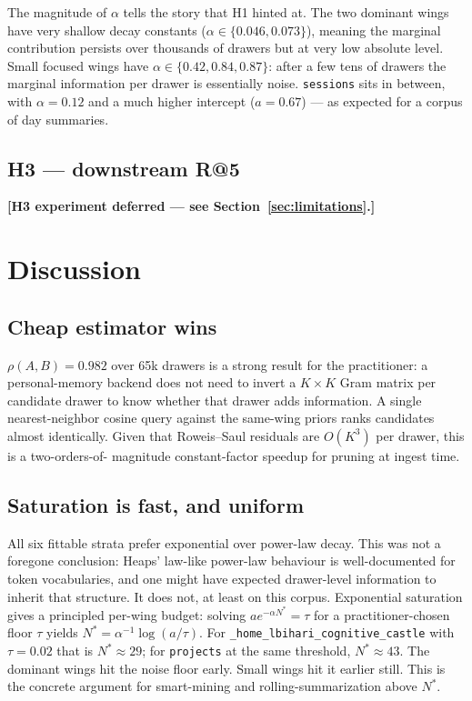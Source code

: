 \documentclass[11pt]{article}
\begin{document}
The magnitude of $\alpha$ tells the story that H1 hinted at.
The two dominant wings have very shallow decay constants
($\alpha \in \{0.046, 0.073\}$), meaning the marginal contribution
persists over thousands of drawers but at very low absolute level.
Small focused wings have $\alpha \in \{0.42, 0.84, 0.87\}$: after a
few tens of drawers the marginal information per drawer is
essentially noise. \texttt{sessions} sits in between, with
$\alpha = 0.12$ and a much higher intercept ($a = 0.67$) --- as
expected for a corpus of day summaries.

\subsection{H3 --- downstream R@5}
\textbf{[H3 experiment deferred --- see
Section~\ref{sec:limitations}.]}

\section{Discussion}
\label{sec:discussion}

\subsection{Cheap estimator wins}
$\rho(A, B) = 0.982$ over 65k drawers is a strong result for the
practitioner: a personal-memory backend does not need to invert a
$K \times K$ Gram matrix per candidate drawer to know whether that
drawer adds information. A single nearest-neighbor cosine query against
the same-wing priors ranks candidates almost identically. Given that
Roweis--Saul residuals are $O(K^3)$ per drawer, this is a two-orders-of-
magnitude constant-factor speedup for pruning at ingest time.

\subsection{Saturation is fast, and uniform}
All six fittable strata prefer exponential over power-law decay. This
was not a foregone conclusion: Heaps' law-like power-law behaviour
\citep{heaps1978} is well-documented for token vocabularies, and one
might have expected drawer-level information to inherit that structure.
It does not, at least on this corpus. Exponential saturation gives a
principled per-wing budget: solving $a e^{-\alpha N^*} = \tau$ for a
practitioner-chosen floor $\tau$ yields
$N^* = \alpha^{-1} \log(a / \tau)$. For
\texttt{\_home\_lbihari\_cognitive\_castle} with $\tau = 0.02$ that is
$N^* \approx 29$; for \texttt{projects} at the same threshold,
$N^* \approx 43$. The dominant wings hit the noise floor early. Small
wings hit it earlier still. This is the concrete argument for
smart-mining and rolling-summarization above $N^*$.
\end{document}
